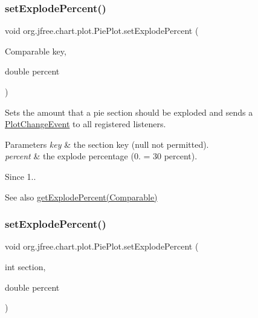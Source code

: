 \subsubsection{\texorpdfstring{set\+Explode\+Percent()}{setExplodePercent()}\hspace{0.1cm}{\footnotesize\ttfamily [1/2]}}
{\footnotesize\ttfamily void org.\+jfree.\+chart.\+plot.\+Pie\+Plot.\+set\+Explode\+Percent (\begin{DoxyParamCaption}\item[{Comparable}]{key,  }\item[{double}]{percent }\end{DoxyParamCaption})}

Sets the amount that a pie section should be exploded and sends a \mbox{\hyperlink{}{Plot\+Change\+Event}} to all registered listeners.


\begin{DoxyParams}{Parameters}
{\em key} & the section key ({\ttfamily null} not permitted). \\
\hline
{\em percent} & the explode percentage (0. = 30 percent).\\
\hline
\end{DoxyParams}
\begin{DoxySince}{Since}
1..
\end{DoxySince}
\begin{DoxySeeAlso}{See also}
\mbox{\hyperlink{classorg_1_1jfree_1_1chart_1_1plot_1_1_pie_plot_ab824066f262be4fe291d104aec9be9e7}{get\+Explode\+Percent(\+Comparable)}} 
\end{DoxySeeAlso}
\mbox{\label{classorg_1_1jfree_1_1chart_1_1plot_1_1_pie_plot_af9aeb60b43813b876e3fbfed4ccd93f0}} 
\subsubsection{\texorpdfstring{set\+Explode\+Percent()}{setExplodePercent()}\hspace{0.1cm}{\footnotesize\ttfamily [2/2]}}
{\footnotesize\ttfamily void org.\+jfree.\+chart.\+plot.\+Pie\+Plot.\+set\+Explode\+Percent (\begin{DoxyParamCaption}\item[{int}]{section,  }\item[{double}]{percent }\end{DoxyParamCaption})}

